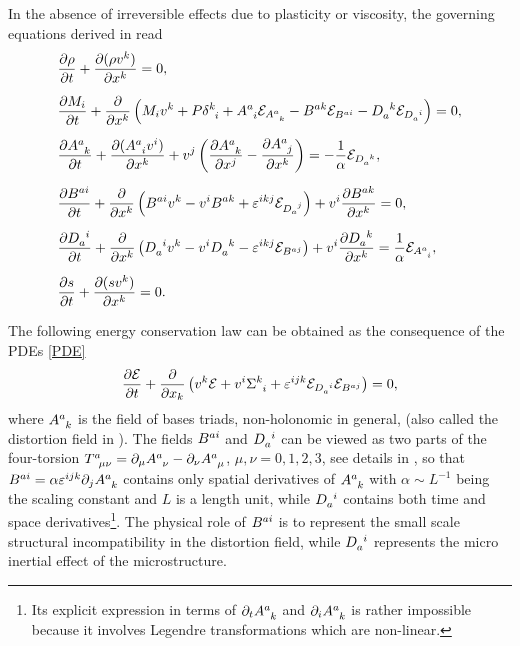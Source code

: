 \documentclass[
10pt, %
a4paper, %
oneside, %
headinclude,footinclude, %
table
]{scrartcl}
\begin{document}
In the absence of irreversible effects due to plasticity or viscosity, the 
governing equations derived in \cite{PRD-Torsion2019} read 
\begin{subequations}\label{PDE}
	\begin{align}
	&\frac{\pd \rho}{\pd t} + \frac{\pd(\rho \vel{k})}{\pd x^k} = 
	0, \label{PDE.extend.rho}
	\\[2mm]
%
	&\frac{\pd M_i}{\pd t} + \frac{ \pd }{\pd x^k}  \left( M_i \vel{k} + P 
	\kronecker{k}{i} + 
	\dist{a}{i}
	\calE_{\dist{a}{k}} - \burg{a}{k} \calE_{\burg{a}{ i}} - \durg{a}{k} 
	\calE_{\durg{a}{ i}}
	\right ) = 0,\label{PDE.extend.M}
	\\[2mm]
%
	&\frac{\pd \dist{a}{k}}{\pd t} +\frac{\pd (  {\dist{a}{i} \vel{i}}  )}{\pd 
	x^k} + 
	\vel{j} \left(\frac{\pd \dist{a}{k}}{\pd x^j} - \frac{\pd\dist{a}{j}}{\pd 
	x^k}\right) = 
	-\frac{1}{\alpha} \calE_{\durg{a}{k}},\label{PDE.extend.A}
	\\[2mm]
%	
	&\frac{\pd \burg{a}{i}}{\pd t} + \frac{\pd}{\pd x^k} \left(
	\burg{a}{i} \vel{k} - \vel{i} \burg{a}{k} + \LeviCivitaUp{ikj} 
	\calE_{\durg{a}{j}}
	\right) + \vel{i} \frac{\pd \burg{a}{k}}{\pd x^k} = 0,\label{PDE.extend.B}
	\\[2mm]
%	
	&\frac{\pd \durg{a}{i}}{\pd t} + \frac{\pd} {\pd x^k} \left( \durg{a}{i} 
	\vel{k}  -  \vel{i} 
	\durg{a}{k} - \LeviCivitaUp{i k j}  \calE_{\burg{a}{j}} \right) + \vel{i} 
	\frac{\pd 
		\durg{a}{k}}{\pd x^k}  = \frac{1}{\alpha}\calE_{\dist{a}{i}}, 
		\label{PDE.extend.D}
	\\[2mm]
%	
	&\frac{\pd s}{\pd t} + \frac{\pd (s \vel{k})}{\pd x^k} = 0. 
	\label{PDE.extend.s}
	\end{align}
\end{subequations}

The following energy conservation law can be obtained as the consequence of the 
PDEs \eqref{PDE}
\begin{equation}\label{energy.law}
\frac{\pd \calE}{\pd t} + \frac{\pd }{\pd x_k} \left( \vel{k} \calE + \vel{i} 
\Stress{k}{i} + \LeviCivitaUp{ijk} 
\calE_{\durg{a}{i}}\calE_{\burg{a}{j}}\right) = 0,
\end{equation}
where $ \dist{a}{k} $ is 
the field of bases triads, non-holonomic in general, (also called the 
distortion field in 
\cite{PRD-Torsion2019,DPRZ2016}). The fields $ B^{{a}{i}} $ and $ \durg{a}{i} 
$ can be viewed as two parts of the four-torsion $ \Tors{a}{\mu\nu} 
= \pd_\mu \dist{a}{\nu} - \pd_\nu \dist{a}{\mu} $, $ \mu,\nu=0,1,2,3 $, see 
details in 
\cite{PRD-Torsion2019}, so that $ \burg{a}{i} = \alpha
\LeviCivitaUp{ijk}\pd_j\dist{a}{k}$ contains only spatial derivatives of $ 
\dist{a}{k} $ with $ \alpha \sim L^{-1}$ being the scaling constant and $ L $ 
is a length unit, while $ \durg{a}{i} $ contains both time and space 
derivatives\footnote{Its 
explicit 
expression in terms of $ 
\pd_t 
\dist{a}{k} $ and $ \pd_i \dist{a}{k} $ is rather impossible because it 
involves Legendre 
transformations which are non-linear.}. The physical role of $ B^{{a}{i}} $ is 
to represent the small scale structural incompatibility in the distortion 
field, while $ \durg{a}{i} $ represents the micro inertial effect of the 
microstructure.
\end{document}
